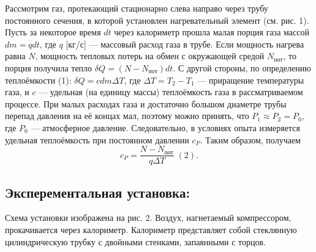 \documentclass[a4paper,12pt]{article}
\begin{document}
		 \begin{figure}[h]
		 \end{figure}
		 Рассмотрим газ, протекающий
		 стационарно слева направо через
		 трубу постоянного сечения, в которой установлен нагревательный элемент (см. рис. 1). Пусть за некоторое
		 время $dt$ через калориметр прошла
		 малая порция газа массой $dm=q dt$,
		 где $q$ [кг/с] — массовый расход газа в трубе. Если мощность нагрева равна $N$, мощность тепловых потерь на обмен с окружающей средой $N_{пот}$, то порция
		 получила тепло $\delta Q = (N-N_{пот})dt$. С другой стороны, по определению теплоёмкости (1): $\delta Q = c dm \Delta T$, где $\Delta T = T_{2}-T_{1}$ — приращение температуры	газа, и $c$ — удельная (на единицу массы) теплоёмкость газа в рассматриваемом процессе. При малых расходах газа и достаточно большом диаметре
		 трубы перепад давления на её концах мал, поэтому можно принять, что $P_{1} \approx P_{2} = P_{0}$, где $P_{0}$ — атмосферное давление. Следовательно, в условиях опыта
		 измеряется удельная теплоёмкость при постоянном давлении $c_{P}$. Таким образом, получаем $$c_{P} = \frac{N-N_{пот}}{q\Delta T} \; (2).$$
		 
	\subsection{Эксперементальная установка:}
	
	Схема установки изображена на рис. 2. Воздух, нагнетаемый компрессором, прокачивается через калориметр. Калориметр представляет собой стеклянную цилиндрическую трубку с двойными стенками, запаянными с торцов.
	
		\begin{figure}[h]
		\end{figure}
	
\end{document}
